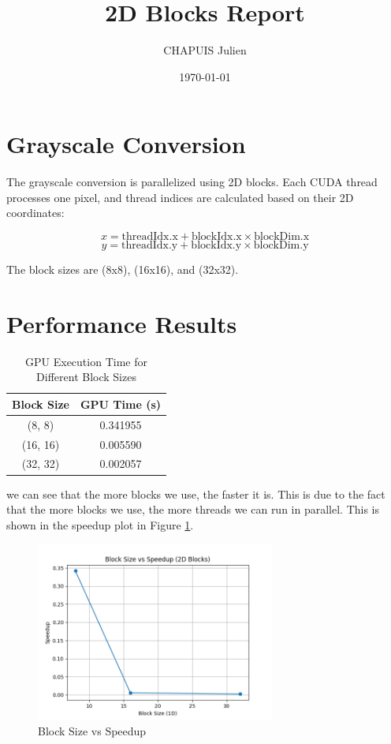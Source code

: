 \documentclass{article}
\title{2D Blocks Report}
\author{CHAPUIS Julien}
\date{\today}
\begin{document}
\section{Grayscale Conversion}
The grayscale conversion is parallelized using 2D blocks. Each CUDA thread processes one pixel, and thread indices are calculated based on their 2D coordinates:

\[
x = \text{threadIdx.x} + \text{blockIdx.x} \times \text{blockDim.x}
\]
\[
y = \text{threadIdx.y} + \text{blockIdx.y} \times \text{blockDim.y}
\]

The block sizes are (8x8), (16x16), and (32x32).

\section{Performance Results}

\begin{table}[h]
\centering
\begin{tabular}{|c|c|}
\hline
\textbf{Block Size} & \textbf{GPU Time (s)} \\
\hline
(8, 8)   & 0.341955 \\
(16, 16) & 0.005590 \\
(32, 32) & 0.002057 \\
\hline
\end{tabular}
\caption{GPU Execution Time for Different Block Sizes}
\label{table:performance}
\end{table}

we can see that the more blocks we use, the faster it is. This is due to the fact that the more blocks we use, the more threads we can run in parallel. This is shown in the speedup plot in Figure \ref{fig:speedup_plot}.

\begin{figure}[h]
\centering
\includegraphics[width=0.7\textwidth]{block_size_vs_speedup.png}
\caption{Block Size vs Speedup}
\label{fig:speedup_plot}
\end{figure}
\end{document}
